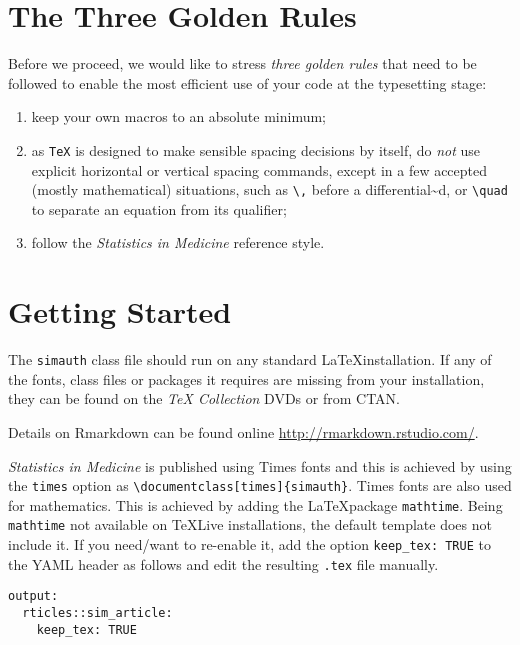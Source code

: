 \documentclass[times,]{simauth}
\begin{document}
\section{The Three Golden Rules}\label{the-three-golden-rules}

Before we proceed, we would like to stress \emph{three golden rules}
that need to be followed to enable the most efficient use of your code
at the typesetting stage:

\begin{enumerate}
\def\labelenumi{\arabic{enumi}.}
\item
  keep your own macros to an absolute minimum;
\item
  as \texttt{TeX} is designed to make sensible spacing decisions by
  itself, do \emph{not} use explicit horizontal or vertical spacing
  commands, except in a few accepted (mostly mathematical) situations,
  such as \texttt{\textbackslash{},} before a
  differential\textasciitilde{}d, or \texttt{\textbackslash{}quad} to
  separate an equation from its qualifier;
\item
  follow the \emph{Statistics in Medicine} reference style.
\end{enumerate}

\section{Getting Started}\label{getting-started}

The \texttt{simauth} class file should run on any standard
\LaTeX installation. If any of the fonts, class files or packages it
requires are missing from your installation, they can be found on the
\emph{TeX Collection} DVDs or from CTAN.

Details on Rmarkdown can be found online
\href{here}{http://rmarkdown.rstudio.com/}.

\emph{Statistics in Medicine} is published using Times fonts and this is
achieved by using the \texttt{times} option as
\texttt{\textbackslash{}documentclass{[}times{]}\{simauth\}}. Times
fonts are also used for mathematics. This is achieved by adding the
\LaTeX package \texttt{mathtime}. Being \texttt{mathtime} not available
on \TeX Live installations, the default template does not include it. If
you need/want to re-enable it, add the option \texttt{keep\_tex:\ TRUE}
to the YAML header as follows and edit the resulting \texttt{.tex} file
manually.

\begin{verbatim}
output:
  rticles::sim_article:
    keep_tex: TRUE
\end{verbatim}
\end{document}
